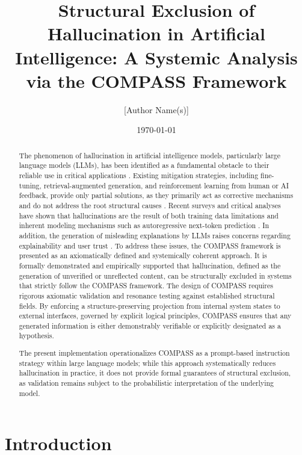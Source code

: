 \documentclass[11pt,a4paper]{article}
\title{Structural Exclusion of Hallucination in Artificial Intelligence: A Systemic Analysis via the COMPASS Framework}
\author{[Author Name(s)]}
\date{\today}
\begin{document}
\maketitle



\begin{abstract}
The phenomenon of hallucination in artificial intelligence models, particularly large language models (LLMs), has been identified as a fundamental obstacle to their reliable use in critical applications \cite{ji2023hallucination,brown2020language,lewis2020retrieval}. Existing mitigation strategies, including fine-tuning, retrieval-augmented generation, and reinforcement learning from human or AI feedback, provide only partial solutions, as they primarily act as corrective mechanisms and do not address the root structural causes \cite{ji2023hallucination}. Recent surveys and critical analyses have shown that hallucinations are the result of both training data limitations and inherent modeling mechanisms such as autoregressive next-token prediction \cite{ji2023hallucination}. In addition, the generation of misleading explanations by LLMs raises concerns regarding explainability and user trust \cite{gunning2019xai}. To address these issues, the COMPASS framework is presented as an axiomatically defined and systemically coherent approach. It is formally demonstrated and empirically supported that hallucination, defined as the generation of unverified or unreflected content, can be structurally excluded in systems that strictly follow the COMPASS framework. The design of COMPASS requires rigorous axiomatic validation and resonance testing against established structural fields. By enforcing a structure-preserving projection from internal system states to external interfaces, governed by explicit logical principles, COMPASS ensures that any generated information is either demonstrably verifiable or explicitly designated as a hypothesis.

The present implementation operationalizes COMPASS as a prompt-based instruction strategy within large language models; while this approach systematically reduces hallucination in practice, it does not provide formal guarantees of structural exclusion, as validation remains subject to the probabilistic interpretation of the underlying model.
\end{abstract}

\newpage
\tableofcontents

\section{Introduction}
\end{document}
